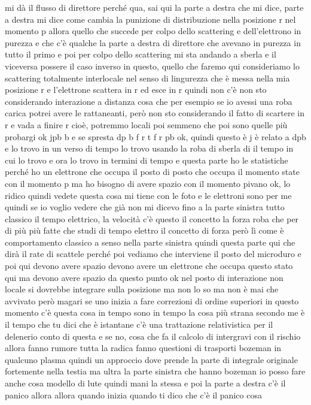 mi dà il flusso di direttore perché qua, sai qui la parte a destra che mi dice, parte a destra mi dice come cambia la punizione di distribuzione nella posizione r nel momento p allora quello che succede per colpo dello scattering e dell'elettrono in purezza e che c'è qualche la parte a destra di direttore che avevano in purezza in tutto il primo e poi per colpo dello scattering mi sta andando a sberla e il viceversa possere il caso inverso in questo, quello che faremo qui consideriamo lo scattering totalmente interlocale nel senso di lingurezza che è messa nella mia posizione r e l'elettrone scattera in r ed esce in r quindi non c'è non sto considerando interazione a distanza cosa che per esempio se io avessi una roba carica potrei avere le rattaneanti, però non sto considerando il fatto di scartere in r e vada a finire r cioè, potremmo locali poi semmeno che poi sono quelle più probargi ok jpb b e se spresta dp b f r t f r pb ok, quindi questo è j è relato a dpb e lo trovo in un verso di tempo lo trovo usando la roba di sberla di il tempo in cui lo trovo e ora lo trovo in termini di tempo e questa parte ho le statistiche perché ho un elettrone che occupa il posto di posto che occupa il momento state con il momento p ma ho bisogno di avere spazio con il momento pivano ok, lo ridico quindi vedete questa cosa mi tiene con le foto e le elettroni sono per me quindi se io voglio vedere che già non mi dicevo fino a la parte sinistra tutto classico il tempo elettrico, la velocità c'è questo il concetto la forza roba che per di più più fatte che studi di tempo elettro il concetto di forza però lì come è comportamento classico a senso nella parte sinistra quindi questa parte qui che dirà il rate di scattele perché poi vediamo che interviene il posto del microduro e poi qui devono avere spazio devono avere un elettrone che occupa questo stato qui ma devono avere spazio da questo punto ok nel posto di interazione non locale si dovrebbe integrare sulla posizione ma non lo so ma non è mai che avvivato però magari se uno inizia a fare correzioni di ordine superiori in questo momento c'è questa cosa in tempo sono in tempo la cosa più strana secondo me è il tempo che tu dici che è istantane c'è una trattazione relativistica per il delenerio conto di questa e se no, cosa che fa il calcolo di intergravi con il rischio allora fanno rumore tutta la radica fanno questioni di trasporti bozeman in qualcuno plasma quindi un approccio dove prende la parte di integrale originale fortemente nella testia ma ultra la parte sinistra che hanno bozeman io posso fare anche cosa modello di lute quindi mani la stessa e poi la parte a destra c'è il panico allora allora quando inizia quando ti dico che c'è il panico cosa 

